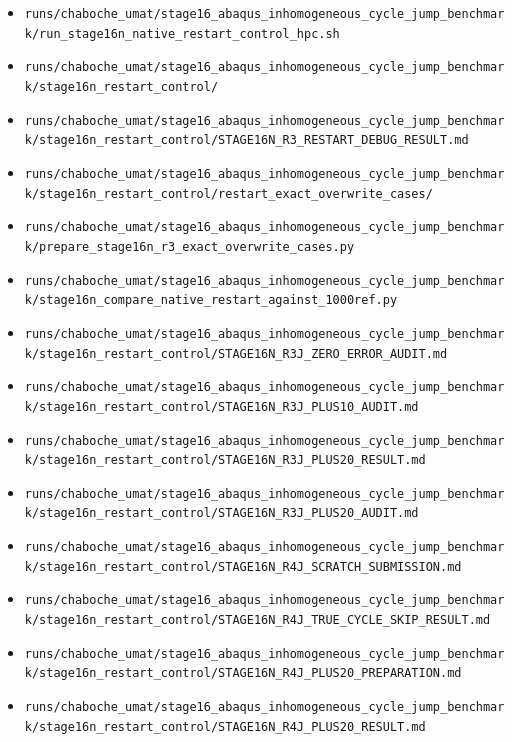 \documentclass[11pt,a4paper]{article}
\newcommand{\code}[1]{\texttt{#1}}
\begin{document}
\begin{itemize}
  \item \code{runs/chaboche\_umat/stage16\_abaqus\_inhomogeneous\_cycle\_jump\_benchmark/run\_stage16n\_native\_restart\_control\_hpc.sh}
  \item \code{runs/chaboche\_umat/stage16\_abaqus\_inhomogeneous\_cycle\_jump\_benchmark/stage16n\_restart\_control/}
  \item \code{runs/chaboche\_umat/stage16\_abaqus\_inhomogeneous\_cycle\_jump\_benchmark/stage16n\_restart\_control/STAGE16N\_R3\_RESTART\_DEBUG\_RESULT.md}
  \item \code{runs/chaboche\_umat/stage16\_abaqus\_inhomogeneous\_cycle\_jump\_benchmark/stage16n\_restart\_control/restart\_exact\_overwrite\_cases/}
  \item \code{runs/chaboche\_umat/stage16\_abaqus\_inhomogeneous\_cycle\_jump\_benchmark/prepare\_stage16n\_r3\_exact\_overwrite\_cases.py}
  \item \code{runs/chaboche\_umat/stage16\_abaqus\_inhomogeneous\_cycle\_jump\_benchmark/stage16n\_compare\_native\_restart\_against\_1000ref.py}
  \item \code{runs/chaboche\_umat/stage16\_abaqus\_inhomogeneous\_cycle\_jump\_benchmark/stage16n\_restart\_control/STAGE16N\_R3J\_ZERO\_ERROR\_AUDIT.md}
  \item \code{runs/chaboche\_umat/stage16\_abaqus\_inhomogeneous\_cycle\_jump\_benchmark/stage16n\_restart\_control/STAGE16N\_R3J\_PLUS10\_AUDIT.md}
  \item \code{runs/chaboche\_umat/stage16\_abaqus\_inhomogeneous\_cycle\_jump\_benchmark/stage16n\_restart\_control/STAGE16N\_R3J\_PLUS20\_RESULT.md}
  \item \code{runs/chaboche\_umat/stage16\_abaqus\_inhomogeneous\_cycle\_jump\_benchmark/stage16n\_restart\_control/STAGE16N\_R3J\_PLUS20\_AUDIT.md}
  \item \code{runs/chaboche\_umat/stage16\_abaqus\_inhomogeneous\_cycle\_jump\_benchmark/stage16n\_restart\_control/STAGE16N\_R4J\_SCRATCH\_SUBMISSION.md}
  \item \code{runs/chaboche\_umat/stage16\_abaqus\_inhomogeneous\_cycle\_jump\_benchmark/stage16n\_restart\_control/STAGE16N\_R4J\_TRUE\_CYCLE\_SKIP\_RESULT.md}
  \item \code{runs/chaboche\_umat/stage16\_abaqus\_inhomogeneous\_cycle\_jump\_benchmark/stage16n\_restart\_control/STAGE16N\_R4J\_PLUS20\_PREPARATION.md}
  \item \code{runs/chaboche\_umat/stage16\_abaqus\_inhomogeneous\_cycle\_jump\_benchmark/stage16n\_restart\_control/STAGE16N\_R4J\_PLUS20\_RESULT.md}

\end{itemize}
\end{document}

